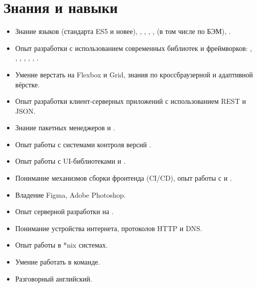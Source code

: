 \section*{Знания и навыки}

\begin{itemize}
    \item Знание языков  (стандарта ES5 и новее), , , , ,  (в том числе по БЭМ), .
    \item Опыт разработки с использованием современных библиотек и фреймворков: , , , , , , .
    \item Умение верстать на Flexbox и Grid, знания по кроссбраузерной и адаптивной вёрстке.
    \item Опыт разработки клиент-серверных приложений с использованием REST и JSON.
    \item Знание пакетных менеджеров  и .
    \item Опыт работы с системами контроля версий .
    \item Опыт работы с UI-библиотеками  и .
    \item Понимание механизмов сборки фронтенда (CI/CD), опыт работы с  и .
    \item Владение Figma, Adobe Photoshop.
    \item Опыт серверной разработки на .
    \item Понимание устройства интернета, протоколов HTTP и DNS.
    \item Опыт работы в *nix системах.
    \item Умение работать в команде.
    \item Разговорный английский.
\end{itemize}

